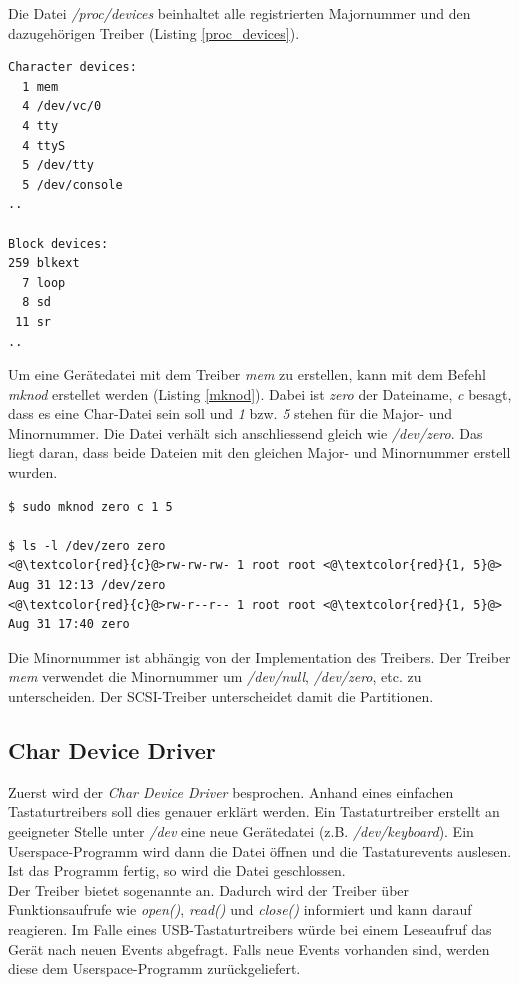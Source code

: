 Die Datei \emph{/proc/devices} beinhaltet alle registrierten Majornummer und den dazugehörigen Treiber (Listing \ref{proc_devices}).
\begin{lstlisting}[label=proc_devices,caption=/proc/devices]
Character devices:
  1 mem
  4 /dev/vc/0
  4 tty
  4 ttyS
  5 /dev/tty
  5 /dev/console
..

Block devices:
259 blkext
  7 loop
  8 sd
 11 sr
..
\end{lstlisting} \hfill

Um eine Gerätedatei mit dem Treiber \emph{mem} zu erstellen, kann mit dem Befehl \emph{mknod} erstellet werden (Listing \ref{mknod}).
Dabei ist \emph{zero} der Dateiname, \emph{c} besagt, dass es eine Char-Datei sein soll und \emph{1} bzw. \emph{5} stehen für die Major- und Minornummer.
Die Datei verhält sich anschliessend gleich wie \emph{/dev/zero}. Das liegt daran, dass beide Dateien mit den gleichen Major- und Minornummer erstell wurden.
\begin{lstlisting}[label=mknod,caption=mknod]
$ sudo mknod zero c 1 5

$ ls -l /dev/zero zero
<@\textcolor{red}{c}@>rw-rw-rw- 1 root root <@\textcolor{red}{1, 5}@> Aug 31 12:13 /dev/zero
<@\textcolor{red}{c}@>rw-r--r-- 1 root root <@\textcolor{red}{1, 5}@> Aug 31 17:40 zero
\end{lstlisting} \hfill

Die Minornummer ist abhängig von der Implementation des Treibers. Der Treiber \emph{mem} verwendet die Minornummer um \emph{/dev/null}, \emph{/dev/zero}, etc. zu unterscheiden.
Der SCSI-Treiber unterscheidet damit die Partitionen.

\subsection{Char Device Driver}

Zuerst wird der \emph{Char Device Driver} besprochen. Anhand eines einfachen Tastaturtreibers soll dies genauer erklärt werden. Ein Tastaturtreiber erstellt an geeigneter
Stelle unter \emph{/dev} eine neue Gerätedatei (z.B. \emph{/dev/keyboard}). Ein Userspace-Programm wird dann die Datei öffnen und die Tastaturevents auslesen. Ist das 
Programm fertig, so wird die Datei geschlossen. \\

Der Treiber bietet sogenannte  an. Dadurch wird der Treiber über Funktionsaufrufe wie \emph{open()}, \emph{read()} und \emph{close()} informiert
und kann darauf reagieren. Im Falle eines USB-Tastaturtreibers würde bei einem Leseaufruf das Gerät nach neuen Events abgefragt. Falls neue Events vorhanden sind, werden diese dem Userspace-Programm
zurückgeliefert.

